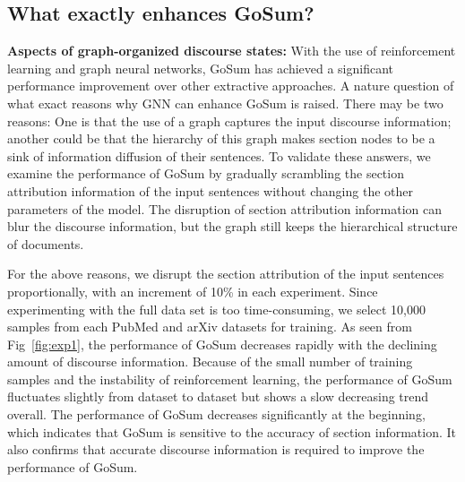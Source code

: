 \documentclass[11pt,a4paper]{article}
\begin{document}
 \subsection{What exactly enhances GoSum?}
\noindent \textbf{Aspects of graph-organized discourse states:}
With the use of reinforcement learning and graph neural networks, GoSum has achieved a significant performance improvement over other extractive approaches.
A nature question of what exact reasons why GNN can enhance GoSum is raised. There may be two reasons:
One is that the use of a graph captures the input discourse information; another could be that the hierarchy of this graph makes  section nodes to be a sink of information diffusion of their sentences.
To validate these answers, we examine the  performance of GoSum by gradually scrambling the section attribution information of the input sentences without changing the other parameters of the model. The disruption of section attribution information can blur the discourse information, but the graph still keeps the hierarchical structure of documents.


For the above reasons, we disrupt the section attribution of the input sentences proportionally, with an increment of 10\% in each experiment.
Since experimenting with the full data set is too time-consuming, we select 10,000 samples from each PubMed and arXiv datasets for training.
As seen from  Fig~\ref{fig:exp1}, the performance of GoSum decreases rapidly with the declining amount of discourse information.
Because of the small number of training samples and the instability of reinforcement learning, the performance of GoSum fluctuates slightly from dataset to dataset but shows a slow decreasing trend overall.
The performance of GoSum decreases significantly at the beginning, which indicates that GoSum is sensitive to the accuracy of section information. It also confirms that accurate discourse information is required to improve the performance of GoSum.
\end{document}
